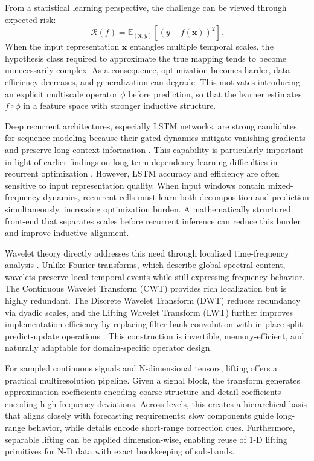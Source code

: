 \documentclass[journal]{IEEEtran}
\begin{document}
From a statistical learning perspective, the challenge can be viewed through expected risk:
\begin{equation}
\mathcal{R}(f)=\mathbb{E}_{(\mathbf{x},y)}\left[(y-f(\mathbf{x}))^2\right].
\end{equation}
When the input representation $\mathbf{x}$ entangles multiple temporal scales, the hypothesis class required to approximate the true mapping tends to become unnecessarily complex. As a consequence, optimization becomes harder, data efficiency decreases, and generalization can degrade. This motivates introducing an explicit multiscale operator $\phi$ before prediction, so that the learner estimates $f\circ\phi$ in a feature space with stronger inductive structure.

Deep recurrent architectures, especially LSTM networks, are strong candidates for sequence modeling because their gated dynamics mitigate vanishing gradients and preserve long-context information \cite{hochreiter1997lstm,gers2000forget}. This capability is particularly important in light of earlier findings on long-term dependency learning difficulties in recurrent optimization \cite{bengio1994learning}. However, LSTM accuracy and efficiency are often sensitive to input representation quality. When input windows contain mixed-frequency dynamics, recurrent cells must learn both decomposition and prediction simultaneously, increasing optimization burden. A mathematically structured front-end that separates scales before recurrent inference can reduce this burden and improve inductive alignment.

Wavelet theory directly addresses this need through localized time-frequency analysis \cite{mallat1989multiresolution,daubechies1992tenlectures}. Unlike Fourier transforms, which describe global spectral content, wavelets preserve local temporal events while still expressing frequency behavior. The Continuous Wavelet Transform (CWT) provides rich localization but is highly redundant. The Discrete Wavelet Transform (DWT) reduces redundancy via dyadic scales, and the Lifting Wavelet Transform (LWT) further improves implementation efficiency by replacing filter-bank convolution with in-place split-predict-update operations \cite{uytterhoeven1997lifting}. This construction is invertible, memory-efficient, and naturally adaptable for domain-specific operator design.

For sampled continuous signals and N-dimensional tensors, lifting offers a practical multiresolution pipeline. Given a signal block, the transform generates approximation coefficients encoding coarse structure and detail coefficients encoding high-frequency deviations. Across levels, this creates a hierarchical basis that aligns closely with forecasting requirements: slow components guide long-range behavior, while details encode short-range correction cues. Furthermore, separable lifting can be applied dimension-wise, enabling reuse of 1-D lifting primitives for N-D data with exact bookkeeping of sub-bands.
\end{document}
